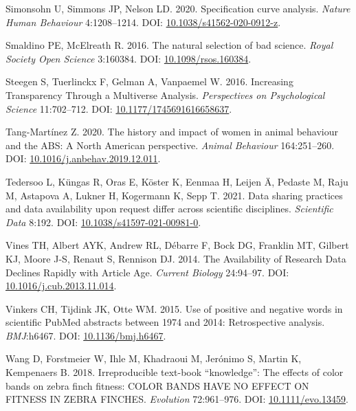 \documentclass[10pt,a4paper]{article}
\newlength{\cslhangindent}
\newlength{\cslentryspacingunit} %
\newenvironment{CSLReferences}[2] %
 {%
  \setlength{\parindent}{0pt}
  \ifodd #1
  \let\oldpar\par
  \def\par{\hangindent=\cslhangindent\oldpar}
  \fi
  \setlength{\parskip}{#2\cslentryspacingunit}
 }%
 {}
\begin{document}
\begin{CSLReferences}{1}{0}
\leavevmode{}%
Simonsohn U, Simmons JP, Nelson LD. 2020. Specification curve analysis. \emph{Nature Human Behaviour} 4:1208--1214. DOI: \href{https://doi.org/10.1038/s41562-020-0912-z}{10.1038/s41562-020-0912-z}.

\leavevmode{}%
Smaldino PE, McElreath R. 2016. The natural selection of bad science. \emph{Royal Society Open Science} 3:160384. DOI: \href{https://doi.org/10.1098/rsos.160384}{10.1098/rsos.160384}.

\leavevmode{}%
Steegen S, Tuerlinckx F, Gelman A, Vanpaemel W. 2016. Increasing {Transparency} {Through} a {Multiverse} {Analysis}. \emph{Perspectives on Psychological Science} 11:702--712. DOI: \href{https://doi.org/10.1177/1745691616658637}{10.1177/1745691616658637}.

\leavevmode{}%
Tang-Martínez Z. 2020. The history and impact of women in animal behaviour and the {ABS}: A {North} {American} perspective. \emph{Animal Behaviour} 164:251--260. DOI: \href{https://doi.org/10.1016/j.anbehav.2019.12.011}{10.1016/j.anbehav.2019.12.011}.

\leavevmode{}%
Tedersoo L, Küngas R, Oras E, Köster K, Eenmaa H, Leijen Ä, Pedaste M, Raju M, Astapova A, Lukner H, Kogermann K, Sepp T. 2021. Data sharing practices and data availability upon request differ across scientific disciplines. \emph{Scientific Data} 8:192. DOI: \href{https://doi.org/10.1038/s41597-021-00981-0}{10.1038/s41597-021-00981-0}.

\leavevmode{}%
Vines TH, Albert AYK, Andrew RL, Débarre F, Bock DG, Franklin MT, Gilbert KJ, Moore J-S, Renaut S, Rennison DJ. 2014. The {Availability} of {Research} {Data} {Declines} {Rapidly} with {Article} {Age}. \emph{Current Biology} 24:94--97. DOI: \href{https://doi.org/10.1016/j.cub.2013.11.014}{10.1016/j.cub.2013.11.014}.

\leavevmode{}%
Vinkers CH, Tijdink JK, Otte WM. 2015. Use of positive and negative words in scientific {PubMed} abstracts between 1974 and 2014: Retrospective analysis. \emph{BMJ}:h6467. DOI: \href{https://doi.org/10.1136/bmj.h6467}{10.1136/bmj.h6467}.

\leavevmode{}%
Wang D, Forstmeier W, Ihle M, Khadraoui M, Jerónimo S, Martin K, Kempenaers B. 2018. Irreproducible text-book {``knowledge''}: {The} effects of color bands on zebra finch fitness: {COLOR} {BANDS} {HAVE} {NO} {EFFECT} {ON} {FITNESS} {IN} {ZEBRA} {FINCHES}. \emph{Evolution} 72:961--976. DOI: \href{https://doi.org/10.1111/evo.13459}{10.1111/evo.13459}.


\end{CSLReferences}
\end{document}
